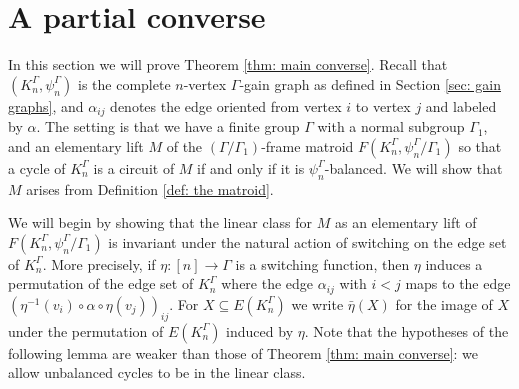 \documentclass[12pt]{article}
\theoremstyle{definition}
\begin{document}
\section{A partial converse} \label{sec: converse}

In this section we will prove Theorem \ref{thm: main converse}.
Recall that $(K_n^{\Gamma}, \psi_n^{\Gamma})$ is the complete $n$-vertex $\Gamma$-gain graph as defined in Section \ref{sec: gain graphs}, and $\alpha_{ij}$ denotes the edge oriented from vertex $i$ to vertex $j$ and labeled by $\alpha$.
The setting is that we have a finite group $\Gamma$ with a normal subgroup $\Gamma_1$, and an elementary lift $M$ of the  $(\Gamma/\Gamma_1)$-frame matroid $F(K_n^{\Gamma}, \psi_n^{\Gamma}/\Gamma_1)$ so that a cycle of $K_n^{\Gamma}$ is a circuit of $M$ if and only if it is $\psi_n^{\Gamma}$-balanced.
We will show that $M$ arises from Definition \ref{def: the matroid}.



We will begin by showing that the linear class for $M$ as an elementary lift of $F(K_n^{\Gamma}, \psi_n^{\Gamma}/\Gamma_1)$ is invariant under the natural action of switching on the edge set of $K_n^{\Gamma}$.
More precisely, if $\eta \colon [n] \to \Gamma$ is a switching function, then $\eta$ induces a permutation of the edge set of $K_n^{\Gamma}$ where the edge $\alpha_{ij}$ with $i < j$ maps to the edge $(\eta^{-1}(v_i) \circ \alpha \circ \eta(v_j))_{ij}$.
For $X \subseteq E(K_n^{\Gamma})$ we write $\bar{\eta}(X)$ for the image of $X$ under the permutation of $E(K_n^{\Gamma})$ induced by $\eta$.
Note that the hypotheses of the following lemma are weaker than those of Theorem \ref{thm: main converse}: we allow unbalanced cycles to be in the linear class.
\end{document}

